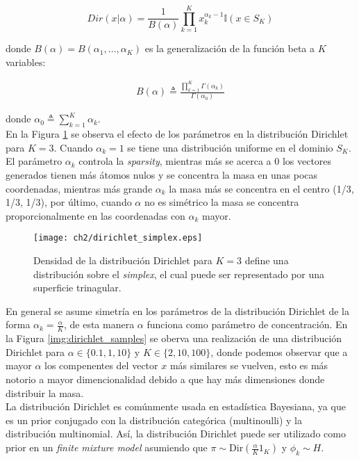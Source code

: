 \documentclass[letterpaper,12pt,oneside]{book} %
\begin{document}
\begin{equation}
    Dir(x|\alpha)=\frac{1}{B(\alpha)}\prod_{k=1}^{K}x_{k}^{\alpha_{k}-1}\mathbb{I}(x\in S_{K})
\end{equation}

donde $B(\alpha) = B(\alpha_{1}, \ldots, \alpha_{K})$ es la generalización de la función beta a $K$ variables:

\begin{align}
    B(\alpha) \triangleq \frac{\prod_{k=1}^{K}\Gamma(\alpha_{k})}{\Gamma(\alpha_{0})}
\end{align}

donde $\alpha_{0} \triangleq \sum_{k=1}^{K}\alpha_{k}$.\\

En la Figura \ref{img:dirichlet_distribution} se observa el efecto de los parámetros en la distribución Dirichlet para $K=3$. Cuando $\alpha_{k}=1$ se tiene una distribución uniforme en el dominio $S_{K}$. El parámetro $\alpha_{k}$ controla la \textit{sparsity}, mientras más se acerca a 0 los vectores generados tienen más átomos nulos y se concentra la masa en unas pocas coordenadas, mientras más grande $\alpha_{k}$ la masa más se concentra en el centro (1/3, 1/3, 1/3), por último, cuando $\alpha$ no es simétrico la masa se concentra proporcionalmente en las coordenadas con $\alpha_{k}$ mayor.\\

\begin{figure}
    \centering
    \texttt{[image: ch2/dirichlet\_simplex.eps]}
    \caption{Densidad de la distribución Dirichlet para $K=3$ define una distribución sobre el \textit{simplex}, el cual puede ser representado por una superficie trinagular.}
    \label{img:dirichlet_distribution}
\end{figure}

En general se asume simetría en los parámetros de la distribución Dirichlet de la forma $\alpha_{k}=\frac{\alpha}{K}$, de esta manera $\alpha$ funciona como parámetro de concentración. En la Figura \ref{img:dirichlet_samples} se oberva una realización de una distribución Dirichlet para $\alpha \in \{0.1, 1, 10\}$ y $K\in\{2, 10, 100\}$, donde podemos observar que a mayor $\alpha$ los compenentes del vector $x$ más similares se vuelven, esto es más notorio a mayor dimencionalidad debido a que hay más dimensiones donde distribuir la masa.\\

La distribución Dirichlet es comúnmente usada en estadística Bayesiana, ya que es un prior conjugado con la distribución categórica (multinoulli) y la distribución multinomial. Así, la distribución Dirichlet puede ser utilizado como prior en un \textit{finite mixture model} asumiendo que $\pi\sim \text{Dir}(\frac{\alpha}{K}1_{K})$ y $\phi_{k} \sim H$.
\end{document}
